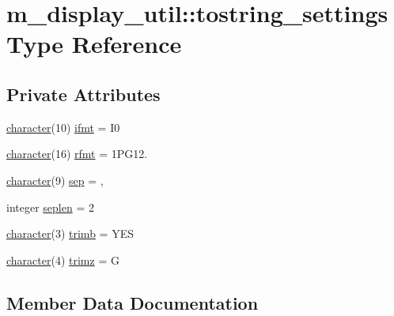 \hypertarget{structm__display__util_1_1tostring__settings}{}\section{m\+\_\+display\+\_\+util\+:\+:tostring\+\_\+settings Type Reference}
\label{structm__display__util_1_1tostring__settings}
\subsection*{Private Attributes}
\begin{DoxyCompactItemize}
\item 
\hyperlink{option__stopwatch_83_8txt_abd4b21fbbd175834027b5224bfe97e66}{character}(10) \hyperlink{structm__display__util_1_1tostring__settings_ae1ae99b05880cf351ea33b8a70cc2e5b}{ifmt} = \textquotesingle{}I0\textquotesingle{}
\item 
\hyperlink{option__stopwatch_83_8txt_abd4b21fbbd175834027b5224bfe97e66}{character}(16) \hyperlink{structm__display__util_1_1tostring__settings_a125b4161ce448ed7ee2223d368fba9a8}{rfmt} = \textquotesingle{}1\+P\+G12.\textquotesingle{}
\item 
\hyperlink{option__stopwatch_83_8txt_abd4b21fbbd175834027b5224bfe97e66}{character}(9) \hyperlink{structm__display__util_1_1tostring__settings_a8601eb40c52f2df82b396490fd7fd568}{sep} = \textquotesingle{}, \textquotesingle{}
\item 
integer \hyperlink{structm__display__util_1_1tostring__settings_a451582606daef119e6720dcce2d489ab}{seplen} = 2
\item 
\hyperlink{option__stopwatch_83_8txt_abd4b21fbbd175834027b5224bfe97e66}{character}(3) \hyperlink{structm__display__util_1_1tostring__settings_abe25da770037b27123ca85b581f08e30}{trimb} = \textquotesingle{}Y\+ES\textquotesingle{}
\item 
\hyperlink{option__stopwatch_83_8txt_abd4b21fbbd175834027b5224bfe97e66}{character}(4) \hyperlink{structm__display__util_1_1tostring__settings_a3b37afe572f70b79ca2204ac5486ca7e}{trimz} = \textquotesingle{}G\textquotesingle{}
\end{DoxyCompactItemize}


\subsection{Member Data Documentation}
\mbox{\label{structm__display__util_1_1tostring__settings_ae1ae99b05880cf351ea33b8a70cc2e5b}} 
